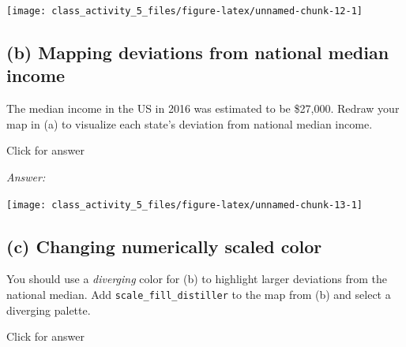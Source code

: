 \documentclass[
]{book}
\newenvironment{Shaded}{\begin{snugshade}}{\end{snugshade}}
\newcommand{\AttributeTok}[1]{\textcolor[rgb]{0.13,0.29,0.53}{#1}}
\newcommand{\CommentTok}[1]{\textcolor[rgb]{0.56,0.35,0.01}{\textit{#1}}}
\newcommand{\DecValTok}[1]{\textcolor[rgb]{0.00,0.00,0.81}{#1}}
\newcommand{\FunctionTok}[1]{\textcolor[rgb]{0.13,0.29,0.53}{\textbf{#1}}}
\newcommand{\NormalTok}[1]{#1}
\newcommand{\SpecialCharTok}[1]{\textcolor[rgb]{0.81,0.36,0.00}{\textbf{#1}}}
\newcommand{\StringTok}[1]{\textcolor[rgb]{0.31,0.60,0.02}{#1}}
\begin{document}
\texttt{[image: class\_activity\_5\_files/figure-latex/unnamed-chunk-12-1]}

\hypertarget{b-mapping-deviations-from-national-median-income}{%
\subsection{(b) Mapping deviations from national median income}\label{b-mapping-deviations-from-national-median-income}}

The median income in the US in 2016 was estimated to be \$27,000. Redraw your map in (a) to visualize each state's deviation from national median income.

Click for answer

\emph{Answer:}

\begin{Shaded}
\end{Shaded}

\texttt{[image: class\_activity\_5\_files/figure-latex/unnamed-chunk-13-1]}

\hypertarget{c-changing-numerically-scaled-color}{%
\subsection{(c) Changing numerically scaled color}\label{c-changing-numerically-scaled-color}}

You should use a \emph{diverging} color for (b) to highlight larger deviations from the national median. Add \texttt{scale\_fill\_distiller} to the map from (b) and select a diverging palette.

Click for answer
\end{document}
